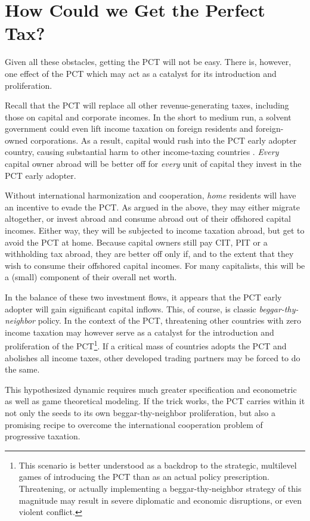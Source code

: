 \section[Prospects of the PCT]{How Could we Get the Perfect Tax?} \label{sec:HowToGetIt} Given all these obstacles, getting the PCT will not be easy.
There is, however, one effect of the PCT which may act as a catalyst for its introduction and proliferation.

Recall that the PCT will replace all other revenue-generating taxes, including those on capital and corporate incomes.
In the short to medium run, a solvent government could even lift income taxation on foreign residents and foreign-owned corporations.
As a result, capital would rush into the PCT early adopter country, causing substantial harm to other income-taxing countries \citep[12]{Dalsgaard2005}.
\emph{Every} capital owner abroad will be better off for \emph{every} unit of capital they invest in the PCT early adopter.

Without international harmonization and cooperation, \emph{home} residents will have an incentive to evade the PCT.
As argued in the above, they may either migrate altogether, or invest abroad and consume abroad out of their offshored capital incomes.
Either way, they will be subjected to income taxation abroad, but get to avoid the PCT at home.
Because capital owners still pay CIT, PIT or a withholding tax abroad, they are better off only if, and to the extent that they wish to consume their offshored capital incomes.
For many capitalists, this will be a (small) component of their overall net worth.

In the balance of these two investment flows, it appears that the PCT early adopter will gain significant capital inflows.
This, of course, is classic \emph{beggar-thy-neighbor} policy.
In the context of the PCT, threatening other countries with zero income taxation may however serve as a catalyst for the introduction and proliferation of the PCT\footnote{This scenario is better understood as a backdrop to the strategic, multilevel games of introducing the PCT than as an actual policy prescription.
Threatening, or actually implementing a beggar-thy-neighbor strategy of this magnitude may result in severe diplomatic and economic disruptions, or even violent conflict.}.
If a critical mass of countries adopts the PCT and abolishes all income taxes, other developed trading partners may be forced to do the same.

This hypothesized dynamic requires much greater specification and econometric as well as game theoretical modeling.
If the trick works, the PCT carries within it not only the seeds to its own beggar-thy-neighbor proliferation, but also a promising recipe to overcome the international cooperation problem of progressive taxation.

